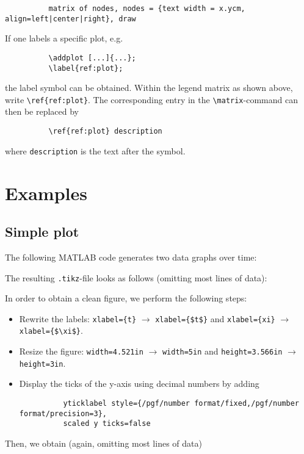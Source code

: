 \documentclass{article}
\begin{document}
\begin{enumerate}
\begin{verbatim}
		  matrix of nodes, nodes = {text width = x.ycm, align=left|center|right}, draw
		\end{verbatim}
	If one labels a specific plot, e.g.
		\begin{verbatim}
		  \addplot [...]{...};
		  \label{ref:plot};
		\end{verbatim}
	the label symbol can be obtained. Within the legend matrix as shown above, write \verb|\ref{ref:plot}|.
	The corresponding entry in the \verb|\matrix|-command can then be replaced by 
		\begin{verbatim}
		  \ref{ref:plot} description
		\end{verbatim}
		where \verb|description| is the text after the symbol.
\end{enumerate}


\pagebreak

\section{Examples}
\label{sec:examples}

\subsection{Simple plot}
\label{ssec:ex_simpleplot}

The following MATLAB code generates two data graphs over time:

\bigskip
{\small {} }

\noindent
The resulting \verb|.tikz|-file looks as follows (omitting most lines of data):

\bigskip
{\small {} }

\noindent
In order to obtain a clean figure, we perform the following steps:
\begin{itemize}[itemsep=0pt]
	\item Rewrite the labels: \verb|xlabel={t}| $\to$ \verb|xlabel={$t$}| and \verb|xlabel={xi}| $\to$ \verb|xlabel={$\xi$}|.
	\item Resize the figure: \verb|width=4.521in| $\to$ \verb|width=5in| and \verb|height=3.566in| $\to$ \verb|height=3in|.
	\item Display the ticks of the y-axis using decimal numbers by adding
		\begin{verbatim}
		  yticklabel style={/pgf/number format/fixed,/pgf/number format/precision=3},
		  scaled y ticks=false
		\end{verbatim}
\end{itemize}
%
Then, we obtain (again, omitting most lines of data)
\end{document}
